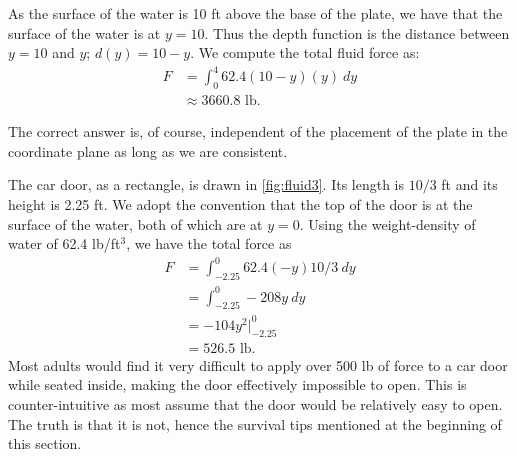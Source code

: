 {\begin{enumerate}
	As the surface of the water is 10 ft above the base of the plate, we have that the surface of the water is at $y=10$. Thus the depth function is the distance between $y=10$ and $y$; $d(y) = 10-y$. We compute the total fluid force as:
	\begin{align*}
	F	&=\int_0^4 62.4(10-y)(y)\ dy \\
		&\approx 3660.8\text{ lb}.
	\end{align*}
\end{enumerate}
The correct answer is, of course, independent of the placement of the plate in the coordinate plane as long as we are consistent.}

{The car door, as a rectangle, is drawn in \autoref{fig:fluid3}. Its length is $10/3$ ft and its height is 2.25 ft. We adopt the convention that the top of the door is at the surface of the water, both of which are at $y=0$. Using the weight-density of water of 62.4 lb/ft$^3$, we have the total force as
%
%
\begin{align*}
	F &=	\int_{-2.25}^0 62.4(-y)10/3\ dy \\
	&= 	\int_{-2.25}^0 -208y\ dy\\
	&= -104y^2\Big|_{-2.25}^0 \\
	&=	526.5 \text{ lb.}
\end{align*}
Most adults would find it very difficult to apply over 500 lb of force to a car door while seated inside, making the door effectively impossible to open. This  is  counter-intuitive as most assume that the door would be relatively easy to open. The truth is that it is not, hence the survival tips mentioned at the beginning of this section.}

